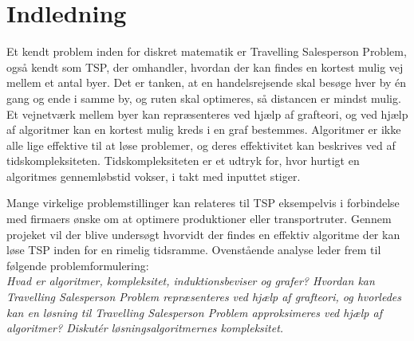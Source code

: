 \chapter{Indledning}
Et kendt problem inden for diskret matematik er Travelling Salesperson Problem, også kendt som TSP, der omhandler, hvordan der kan findes en kortest mulig vej mellem et antal byer. 
Det er tanken, at en handelsrejsende skal besøge hver by én gang og ende i samme by, og ruten skal optimeres, så distancen er mindst mulig. 
Et vejnetværk mellem byer kan repræsenteres ved hjælp af grafteori, og ved hjælp af algoritmer kan en kortest mulig kreds i en graf bestemmes. 
Algoritmer er ikke alle lige effektive til at løse problemer, og deres effektivitet kan beskrives ved af tidskompleksiteten. 
Tidskompleksiteten er et udtryk for, hvor hurtigt en algoritmes gennemløbstid vokser, i takt med inputtet stiger. 

Mange virkelige problemstillinger kan relateres til TSP eksempelvis i forbindelse med firmaers ønske om at optimere produktioner eller transportruter. 
Gennem projeket vil der blive undersøgt hvorvidt der findes en effektiv algoritme der kan løse TSP inden for en rimelig tidsramme.
Ovenstående analyse leder frem til følgende problemformulering:\\

\textit{Hvad er algoritmer, kompleksitet, induktionsbeviser og grafer? Hvordan kan Travelling Salesperson Problem repræsenteres ved hjælp af grafteori, og hvorledes kan en løsning til Travelling Salesperson Problem approksimeres ved hjælp af algoritmer? Diskutér løsningsalgoritmernes kompleksitet.}
